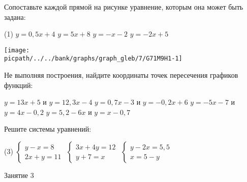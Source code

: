 \begin{homework}[number=1]
	\begin{listofex}
		\item 
		\begin{minipage}[t]{0.4\linewidth}
		Сопоставьте каждой прямой на рисунке уравнение, которым она может быть задана:
		\begin{tasks}(1)
			\task \( y=0,5 x+4 \)
			\task \( y=5x + 8 \)
			\task \( y=-x-2 \)
			\task \( y=-2x+5 \)
		\end{tasks}
	\end{minipage}
		\begin{minipage}[t]{0.55\linewidth}
			\texttt{[image: \\picpath/../../bank/graphs/graph\_gleb/7/G71M9H1-1]}
		\end{minipage}
		
		\item Не выполняя построения, найдите координаты точек пересечения графиков функций:
		\begin{tasks}
			\task \( y=13x +5 \) и \(y=12,3x-4\)
			\task \( y=0,7x-3 \) и \(y=-0,2x+6\)
			\task \( y=-5x-7 \) и \( y=4x-0,2 \)
			\task \( y=5,2-6x \) и \( y=x-0,7 \)
		\end{tasks}
		\item Решите системы уравнений:
		\begin{tasks}(3)
			\task \( \begin{cases} y-x=8 \\ 2x+y=11 \end{cases} \)
			\task \( \begin{cases} 3x+4y = 12 \\ y+7=x \end{cases} \)
			\task \( \begin{cases} y-2x=5,5 \\ x=5-y \end{cases} \)
		\end{tasks}
	\end{listofex}
\end{homework}

\begin{class}[number=3]
	\begin{listofex}
		\item Занятие 3 
	\end{listofex}
\end{class}

